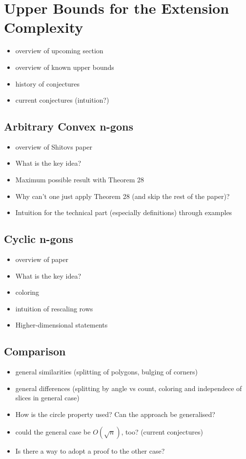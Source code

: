 
\section{Upper Bounds for the Extension Complexity}

\begin{itemize}
  \item overview of upcoming section
  \item overview of known upper bounds
  \item history of conjectures
  \item current conjectures (intuition?)
\end{itemize}

\subsection{Arbitrary Convex n-gons}

\begin{itemize}
  \item overview of Shitovs paper
  \item What is the key idea?
  \item Maximum possible result with Theorem 28
  \item Why can't one just apply Theorem 28 (and skip the rest of the paper)?
  \item Intuition for the technical part (especially definitions) through examples
\end{itemize}

\subsection{Cyclic n-gons}

\begin{itemize}
  \item overview of paper
  \item What is the key idea?
  \item coloring
  \item intuition of rescaling rows
  \item Higher-dimensional statements
\end{itemize}

\subsection{Comparison}

\begin{itemize}
  \item general similarities (splitting of polygons, bulging of corners)
  \item general differences (splitting by angle vs count, coloring and independece of slices in general case)
  \item How is the circle property used? Can the approach be generalised?
  \item could the general case be $O(\sqrt{n})$, too? (current conjectures)
  \item Is there a way to adopt a proof to the other case?
\end{itemize}
